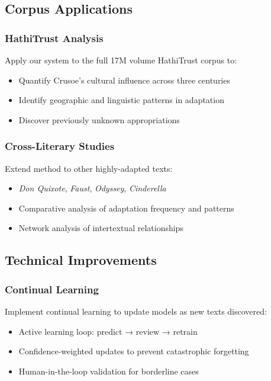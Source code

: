 \documentclass[12pt,a4paper]{article}
\begin{document}
\subsection{Corpus Applications}

\subsubsection{HathiTrust Analysis}

Apply our system to the full 17M volume HathiTrust corpus to:
\begin{itemize}
    \item Quantify Crusoe's cultural influence across three centuries
    \item Identify geographic and linguistic patterns in adaptation
    \item Discover previously unknown appropriations
\end{itemize}

\subsubsection{Cross-Literary Studies}

Extend method to other highly-adapted texts:
\begin{itemize}
    \item \textit{Don Quixote}, \textit{Faust}, \textit{Odyssey}, \textit{Cinderella}
    \item Comparative analysis of adaptation frequency and patterns
    \item Network analysis of intertextual relationships
\end{itemize}

\subsection{Technical Improvements}

\subsubsection{Continual Learning}

Implement continual learning to update models as new texts discovered:
\begin{itemize}
    \item Active learning loop: predict → review → retrain
    \item Confidence-weighted updates to prevent catastrophic forgetting
    \item Human-in-the-loop validation for borderline cases
\end{itemize}
\end{document}
